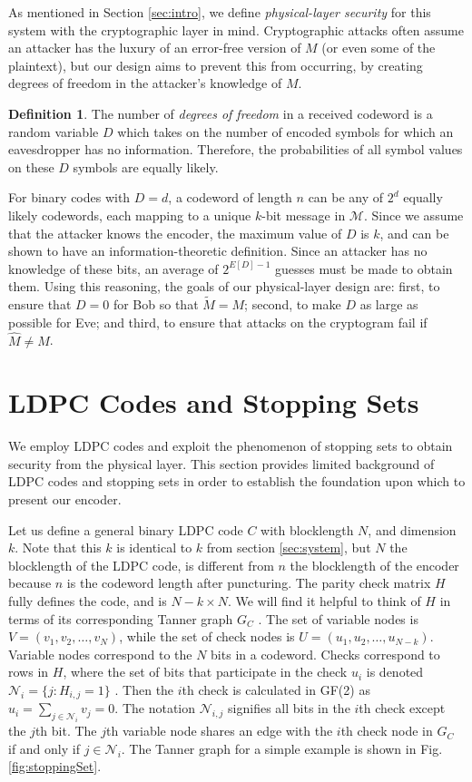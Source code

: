 \documentclass[10pt,twocolumn,twoside]{IEEEtran} \newlength{\pic}
\theoremstyle{definition}
\newtheorem{definition}{Definition}
\theoremstyle{remark}
\theoremstyle{plain}
\begin{document}
As mentioned in Section \ref{sec:intro}, we define \emph{physical-layer security} for this system with the cryptographic layer in mind. Cryptographic attacks often assume an attacker has the luxury of an error-free version of $M$ (or even some of the plaintext), but our design aims to prevent this from occurring, by creating degrees of freedom in the attacker's knowledge of $M$.
\begin{definition}\label{def:degsFreedom}
 The number of \emph{degrees of freedom} in a received codeword is a random variable $D$ which takes on the number of encoded symbols for which an eavesdropper has no information. Therefore, the probabilities of all symbol values on these $D$ symbols are equally likely.
\end{definition}
For binary codes with $D=d$, a codeword of length $n$ can be any of $2^d$ equally likely codewords, each mapping to a unique $k$-bit message in $\mathcal{M}$. Since we assume that the attacker knows the encoder, the maximum value of $D$ is $k$, and can be shown to have an information-theoretic definition. Since an attacker has no knowledge of these bits, an average of $2^{E[D]-1}$ guesses must be made to obtain them. Using this reasoning, the goals of our physical-layer design are: first, to ensure that $D=0$ for Bob so that $\tilde{M} = M$; second, to make $D$ as large as possible for Eve; and third, to ensure that attacks on the cryptogram fail if $\hat{M} \neq M$.

\section{LDPC Codes and Stopping Sets}\label{sec:stoppingSets}
We employ LDPC codes \cite{Gallager63} and exploit the phenomenon of stopping sets to obtain security from the physical layer. This section provides limited background of LDPC codes and stopping sets in order to establish the foundation upon which to present our encoder.

Let us define a general binary LDPC code $C$ with blocklength $N$, and dimension $k$. Note that this $k$ is identical to $k$ from section \ref{sec:system}, but $N$ the blocklength of the LDPC code, is different from $n$ the blocklength of the encoder because $n$ is the codeword length after puncturing. The parity check matrix $H$ fully defines the code, and is $N - k \times N$. We will find it helpful to think of $H$ in terms of its corresponding Tanner graph $G_C$ \cite{MoonArches,UrbankeModern}. The set of variable nodes is $V = (v_1, v_2, \ldots, v_N)$, while the set of check nodes is $U = (u_1, u_2, \ldots, u_{N-k})$. Variable nodes correspond to the $N$ bits in a codeword. Checks correspond to rows in $H$, where the set of bits that participate in the check $u_i$ is denoted $\mathcal{N}_i = \{j: H_{i,j} = 1\}$ \cite{MoonArches}. Then the $i$th check is calculated in GF(2) as $u_i = \sum_{j\in \mathcal{N}_i}v_j = 0$. The notation $\mathcal{N}_{i,j}$ signifies all bits in the $i$th check except the $j$th bit. The $j$th variable node shares an edge with the $i$th check node in $G_C$ if and only if $j\in \mathcal{N}_i$. The Tanner graph for a simple example is shown in Fig. \ref{fig:stoppingSet}.
\end{document}
